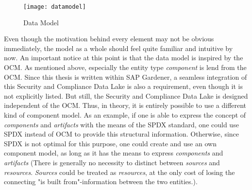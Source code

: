 \begin{figure}[H]
	\centering
	\texttt{[image: datamodel]}
	\caption[Data Model]{Data Model }
	\label{fig:DataModel}
\end{figure} 

Even though the motivation behind every element may not be obvious immediately, the model as a whole should feel quite familiar and intuitive by now. An important notice at this point is that the data model is inspired by the OCM. As mentioned above, especially the entity type \emph{component} is lend from the OCM. Since this thesis is written within SAP Gardener, a seamless integration of this Security and Compliance Data Lake is also a requirement, even though it is not explicitly listed. But still, the Security and Compliance Data Lake is designed independent of the OCM. Thus, in theory, it is entirely possible to use a different kind of component model. As an example, if one is able to express the concept of \emph{components} and \emph{artifacts} with the means of the SPDX standard, one could use SPDX instead of OCM to provide this structural information. Otherwise, since SPDX is not optimal for this purpose, one could create and use an own component model, as long as it has the means to express \emph{components} and \emph{artifacts} (There is generally no necessity to distinct between \emph{sources} and \emph{resources}. \emph{Sources} could be treated as \emph{resources}, at the only cost of losing the connecting "is built from"-information between the two entities.).


